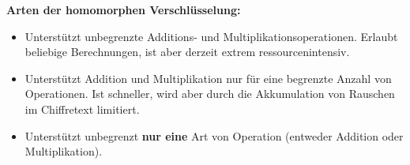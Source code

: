 \documentclass[
../../css_summary.tex,
]{subfiles}
\begin{document}
\textbf{Arten der homomorphen Verschlüsselung:}
\begin{itemize}
  \item {} Unterstützt unbegrenzte Additions- und Multiplikationsoperationen. Erlaubt beliebige Berechnungen, ist aber derzeit extrem ressourcenintensiv.
  \item {} Unterstützt Addition und Multiplikation nur für eine begrenzte Anzahl von Operationen. Ist schneller, wird aber durch die Akkumulation von Rauschen im Chiffretext limitiert.
  \item {} Unterstützt unbegrenzt \textbf{nur eine} Art von Operation (entweder Addition oder Multiplikation).
\end{itemize}
\end{document}
